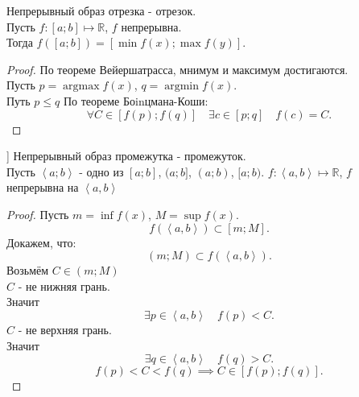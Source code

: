 \documentclass[11pt, oneside]{article}   	%
\DeclareMathOperator{\argmin}{argmax}
\DeclareMathOperator{\argmax}{argmin}
\begin{document}
    \begin{theorem}
        Непрерывный образ отрезка - отрезок.\\
        Пусть $f: \left[a; b\right] \mapsto \mathbb{R}$, $f$ непрерывна.\\
        Тогда $f(\left[a;b\right]) = \left[\min f(x); \max f(y)\right]$.
        \begin{proof}
            По теореме Вейершатрасса, мнимум и максимум достигаются.\\
            Пусть $p = \argmin f(x)$, $q = \argmax f(x)$.\\
            Путь $p\le q$
            По теореме Боinцмана-Коши:\\
            \[ \forall{C\in \left[f(p); f(q)\right]}\quad \exists{c\in \left[p; q\right]}\quad f(c) = C   .\] 
        \end{proof}
    \end{theorem}
    \begin{theorem}]
        Непрерывный образ промежутка - промежуток.\\
        Пусть $ \left<a; b\right>$ - одно из $\left[a; b\right]$, $(a;b]$, $ \left( a; b \right) $, $[a; b)$.
        $f: \left<a, b\right> \mapsto \mathbb{R}$, $f$ непрерывна на $\left<a, b\right>$
        \begin{proof}
            Пусть $m =\inf f(x)$, $M = \sup f(x)$.\\
            \[ f(\left<a, b\right>) \subset \left[m; M\right] .\] 
            Докажем, что:
            \[ \left( m; M \right) \subset f(\left<a, b\right>) .\]
            Возьмём $C\in \left( m; M \right) $\\
            $C$ - не нижняя грань.\\
            Значит
            \[ \exists{p\in \left<a, b\right>}\quad f(p) < C  .\]
            $C$ - не верхняя грань.\\
            Значит
            \[ \exists{q\in \left<a, b\right>}\quad f(q) > C  .\]
            \[ f(p) < C < f(q) \implies C\in \left[f(p); f(q)\right] .\] 
        \end{proof}
    \end{theorem}
\end{document}
